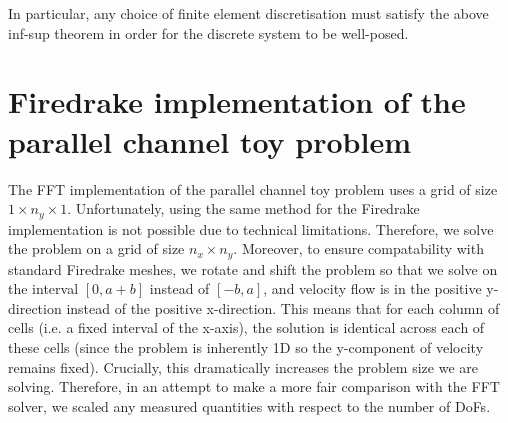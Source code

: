 \documentclass[12pt]{article}
\theoremstyle{theorem}
\begin{document}
In particular, any choice of finite element discretisation must satisfy the above inf-sup theorem in order for the discrete system to be well-posed.


\section{Firedrake implementation of the parallel channel toy problem}\label{app: firedrake-parallel-channel}

The FFT implementation of the parallel channel toy problem uses a grid of size $1 \times n_y \times 1$. Unfortunately, using the same method for the Firedrake implementation is not possible due to technical limitations. Therefore, we solve the problem on a grid of size $n_x \times n_y$. Moreover, to ensure compatability with standard Firedrake meshes, we rotate and shift the problem so that we solve on the interval $[0, a+b]$ instead of $[-b, a]$, and velocity flow is in the positive y-direction instead of the positive x-direction. This means that for each column of cells (i.e. a fixed interval of the x-axis), the solution is identical across each of these cells (since the problem is inherently 1D so the y-component of velocity remains fixed). Crucially, this dramatically increases the problem size we are solving. Therefore, in an attempt to make a more fair comparison with the FFT solver, we scaled any measured quantities with respect to the number of DoFs.
\end{document}
